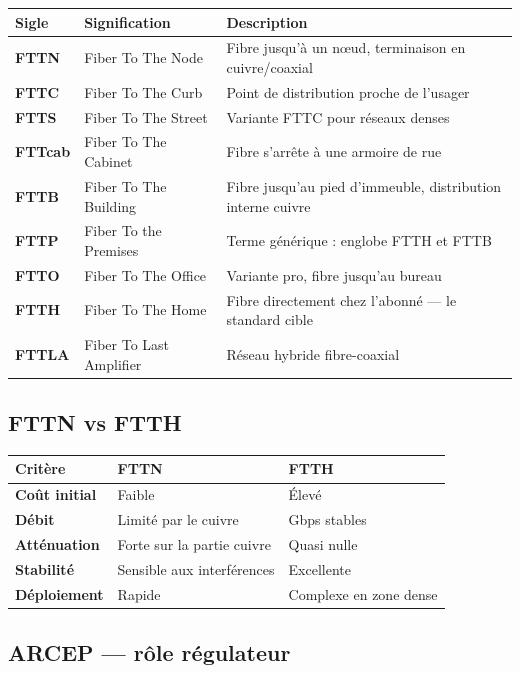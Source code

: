 \documentclass[11pt,a4paper]{article}
\begin{document}
\renewcommand{\arraystretch}{1.3}
\begin{tabularx}{\linewidth}{@{}>{\bfseries}l l X@{}}
\toprule
\rowcolor{light} Sigle & Signification & Description \\ \midrule
FTTN    & Fiber To The Node     & Fibre jusqu'à un nœud, terminaison en cuivre/coaxial \\
FTTC    & Fiber To The Curb     & Point de distribution proche de l'usager \\
FTTS    & Fiber To The Street   & Variante FTTC pour réseaux denses \\
FTTcab  & Fiber To The Cabinet  & Fibre s'arrête à une armoire de rue \\
FTTB    & Fiber To The Building & Fibre jusqu'au pied d'immeuble, distribution interne cuivre \\
FTTP    & Fiber To the Premises & Terme générique : englobe FTTH et FTTB \\
FTTO    & Fiber To The Office   & Variante pro, fibre jusqu'au bureau \\
\textcolor{accent}{FTTH}    & \textcolor{accent}{Fiber To The Home} & \textcolor{accent}{Fibre directement chez l'abonné — le standard cible} \\
FTTLA   & Fiber To Last Amplifier & Réseau hybride fibre-coaxial \\
\bottomrule
\end{tabularx}

\subsection{FTTN vs FTTH}

\begin{tabularx}{\linewidth}{@{}>{\bfseries}p{2.5cm} X X@{}}
\toprule
\rowcolor{light} Critère & FTTN & FTTH \\ \midrule
Coût initial      & Faible          & Élevé \\
Débit             & Limité par le cuivre & Gbps stables \\
Atténuation       & Forte sur la partie cuivre & Quasi nulle \\
Stabilité         & Sensible aux interférences & Excellente \\
Déploiement       & Rapide          & Complexe en zone dense \\
\bottomrule
\end{tabularx}

\subsection{ARCEP — rôle régulateur}
\end{document}
